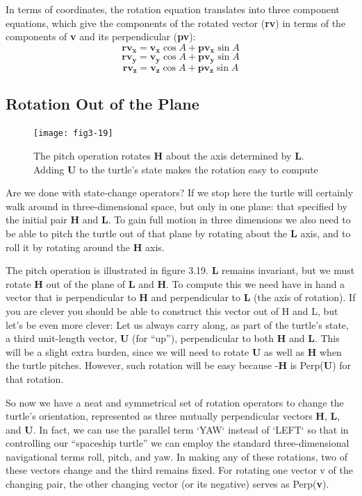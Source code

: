 \documentclass{book}
\begin{document}
In terms of coordinates, the rotation equation translates into three
component equations, which give the components of the rotated vector
(\textbf{rv}) in terms of the components of \textbf{v} and its perpendicular (\textbf{pv}):
$$\mathbf{rv_x} = \mathbf{v_x} \cos A + \mathbf{pv_x} \sin A$$
$$\mathbf{rv_y} = \mathbf{v_y} \cos A + \mathbf{pv_y} \sin A$$
$$\mathbf{rv_z} = \mathbf{v_z} \cos A + \mathbf{pv_z} \sin A$$

\subsection{Rotation Out of the Plane}

\begin{figure}
\begin{center}
\texttt{[image: fig3-19]}
\caption{The pitch operation rotates \textbf{H} about the axis determined by \textbf{L}. Adding \textbf{U} to the turtle's state makes the rotation easy to compute}
\end{center}
\end{figure}

Are we done with state-change operators? If we stop here the turtle will
certainly walk around in three-dimensional space, but only in one plane:
that specified by the initial pair \textbf{H} and \textbf{L}. To gain full motion in three
dimensions we also need to be able to pitch the turtle out of that plane
by rotating about the \textbf{L} axis, and to roll it by rotating around the \textbf{H}
axis.

The pitch operation is illustrated in figure 3.19. \textbf{L} remains invariant,
but we must rotate \textbf{H} out of the plane of \textbf{L} and \textbf{H}. To compute this we
need have in hand a vector that is perpendicular to \textbf{H} and perpendicular
to \textbf{L} (the axis of rotation). If you are clever you should be able to
construct this vector out of H and L, but let's be even more clever: Let
us always carry along, as part of the turtle's state, a third unit-length
vector, \textbf{U} (for ``up''), perpendicular to both \textbf{H} and \textbf{L}. This will be a
slight extra burden, since we will need to rotate \textbf{U} as well as \textbf{H} when
the turtle pitches. However, such rotation will be easy because -\textbf{H} is
Perp(\textbf{U}) for that rotation.

So now we have a neat and symmetrical set of rotation operators to
change the turtle's orientation, represented as three mutually perpendicular vectors \textbf{H}, \textbf{L}, and \textbf{U}. In fact, we can use the parallel term \textsc{`YAW`}
instead of \textsc{`LEFT`} so that in controlling our ``spaceship turtle'' we can
employ the standard three-dimensional navigational terms roll, pitch,
and yaw. In making any of these rotations, two of these vectors change
and the third remains fixed. For rotating one vector v of the changing
pair, the other changing vector (or its negative) serves as Perp(\textbf{v}).
\end{document}
